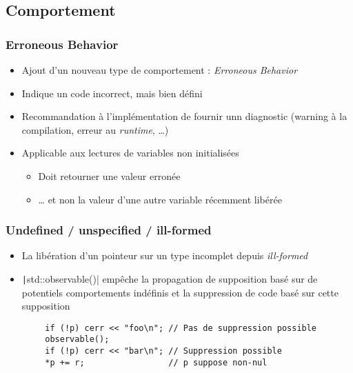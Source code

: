 \documentclass[C++.tex]{subfiles}
\begin{document}
\subsection*{Comportement}
\begin{frame}[fragile]
	\frametitle{Erroneous Behavior}
	\begin{itemize}
		\item Ajout d'un nouveau type de comportement : \textit{Erroneous Behavior}
		\item Indique un code incorrect, mais bien défini
		\item Recommandation à l'implémentation de fournir unn diagnostic (warning à la compilation, erreur au \textit{runtime}, \ldots{})
		\item Applicable aux lectures de variables non initialisées
		\begin{itemize}
			\item Doit retourner une valeur \og{}erronée\fg{}


			\item \ldots{} et non la valeur d'une autre variable récemment libérée
		\end{itemize}
	\end{itemize}

\end{frame}

\begin{frame}[fragile]
	\frametitle{Undefined / unspecified / ill-formed}
	\begin{itemize}
		\item La libération d'un pointeur sur un type incomplet depuis \textit{ill-formed}


		\item \texttt|std::observable()| empêche la propagation de supposition basé sur de potentiels comportements indéfinis et la suppression de code basé sur cette supposition
	\end{itemize}

	\begin{verbatim}
		if (!p) cerr << "foo\n"; // Pas de suppression possible
		observable();
		if (!p) cerr << "bar\n"; // Suppression possible
		*p += r;                 // p suppose non-nul
	\end{verbatim}

\end{frame}
\end{document}
